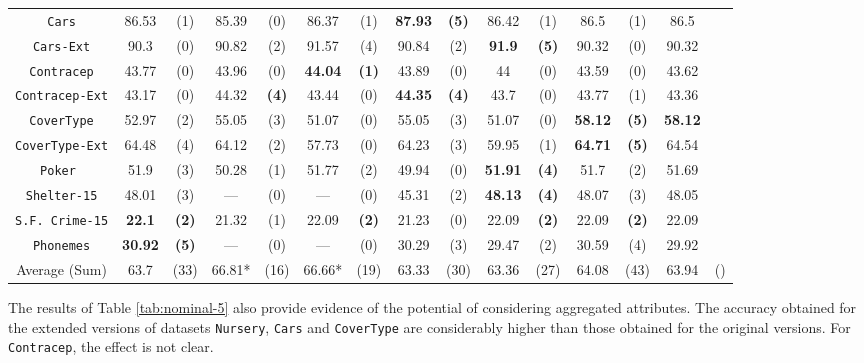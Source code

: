 \begin{table*}[t]
\begin{tabular}{c|cc|cc|cc|cc|cc|cc|cc}
{\tt Cars}          & 86.53    & (1)    & 85.39    & (0)    & 86.37    & (1)    &{\bf87.93}&{\bf(5)}& 86.42    & (1)    & 86.5     & (1)             & 86.5     &    \\
{\tt Cars-Ext}      & 90.3     & (0)    & 90.82    & (2)    & 91.57    & (4)    & 90.84    & (2)    &{\bf 91.9}&{\bf(5)}& 90.32    & (0)             & 90.32    &    \\
{\tt Contracep}     & 43.77    & (0)    & 43.96    & (0)    &{\bf44.04}&{\bf(1)}& 43.89    & (0)    & 44       & (0)    & 43.59    & (0)             & 43.62    &    \\
{\tt Contracep-Ext} & 43.17    & (0)    & 44.32    &{\bf(4)}& 43.44    & (0)    &{\bf44.35}&{\bf(4)}& 43.7     & (0)    & 43.77    & (1)             & 43.36    &    \\
{\tt CoverType}     & 52.97    & (2)    & 55.05    & (3)    & 51.07    & (0)    & 55.05    & (3)    & 51.07    & (0)    &{\bf58.12}&{\bf(5)}         &{\bf58.12}&    \\
{\tt CoverType-Ext} & 64.48    & (4)    & 64.12    & (2)    & 57.73    & (0)    & 64.23    & (3)    & 59.95    & (1)    &{\bf64.71}&{\bf(5)}         & 64.54    &    \\ 
{\tt Poker }        & 51.9     & (3)    & 50.28    & (1)    & 51.77    & (2)    & 49.94    & (0)    &{\bf51.91}&{\bf(4)}& 51.7     & (2)             & 51.69    &    \\
{\tt Shelter-15}    & 48.01    & (3)    & ---      & (0)    & ---      & (0)    & 45.31    & (2)    &{\bf48.13}&{\bf(4)}& 48.07    & (3)             & 48.05    &    \\   
{\tt S.F. Crime-15} &{\bf22.1} &{\bf(2)}& 21.32    & (1)    & 22.09    &{\bf(2)}& 21.23    & (0)    & 22.09    &{\bf(2)}& 22.09    &{\bf(2)}         & 22.09    &    \\
{\tt Phonemes}      &{\bf30.92}&{\bf(5)}& ---      & (0)    & ---      & (0)    & 30.29    & (3)    & 29.47    & (2)    & 30.59    & (4)             & 29.92    &    \\
\hline
Average (Sum)       &     63.7 & (33)   & 66.81*   & (16)   & 66.66*   & (19)   & 63.33    & (30)   & 63.36    & (27)   & 64.08    & (43)            & 63.94    & ()

\end{tabular}
\label{tab:nominal-5}
\normalsize
\end{table*}


The results of  Table \ref{tab:nominal-5} also
provide evidence of  the potential
of considering aggregated attributes. 
The accuracy obtained for the extended versions of datasets
{\tt Nursery}, {\tt Cars} and {\tt CoverType} are considerably higher than those obtained for 
the original versions. For {\tt Contracep}, the effect is not clear.

